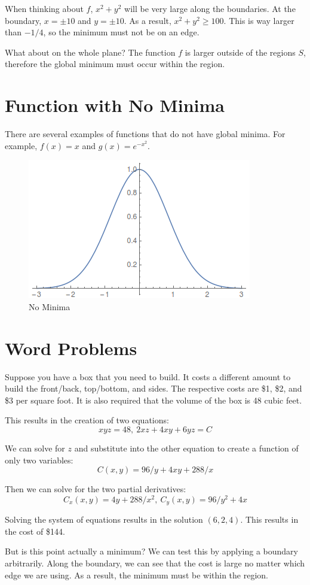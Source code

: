 \documentclass{article}
\begin{document}
When thinking about $f$, $x^{2} + y^{2}$ will be very large along the
boundaries. At the boundary, $x = \pm 10$ and $y = \pm 10$. As a result, $x^{2}
+ y^{2} \geq 100$. This is way larger than $-1/4$, so the minimum must not be on
an edge.

\bigbreak

What about on the whole plane? The function $f$ is larger outside of the regions
$S$, therefore the global minimum must occur within the region.

\section{Function with No Minima}

There are several examples of functions that do not have global minima. For
example, $f(x) = x$ and $g(x) = e^{-x^{2}}$.

\begin{figure}[H]
  \centering
  \includegraphics[scale=0.60]{"NoMinima"}
  \caption{No Minima}
\end{figure}

\section{Word Problems}

Suppose you have a box that you need to build. It costs a different amount to
build the front/back, top/bottom, and sides. The respective costs are \$1, \$2,
and \$3 per square foot. It is also required that the volume of the box is 48
cubic feet.

\bigbreak

This results in the creation of two equations:
$$ xyz = 48, \ 2xz + 4xy + 6yz = C $$

We can solve for $z$ and substitute into the other equation to create a function
of only two variables:
$$ C(x, y) = 96/y + 4xy + 288/x $$

Then we can solve for the two partial derivatives:
$$ C_{x}(x, y) = 4y + 288/x^{2}, \ C_{y}(x, y) = 96/y^{2} + 4x $$

Solving the system of equations results in the solution $(6, 2, 4)$. This
results in the cost of \$144.

\bigbreak

But is this point actually a minimum? We can test this by applying a boundary
arbitrarily. Along the boundary, we can see that the cost is large no matter
which edge we are using. As a result, the minimum must be within the region.
\end{document}
